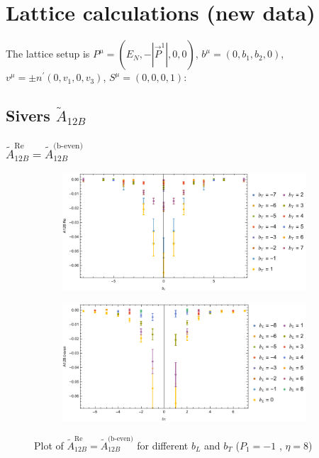 \documentclass[]{article}
\numberwithin{equation}{section}
\newcommand{\tAmp}{\widetilde{A}}
\newcommand{\tAmp}{\ensuremath{\widetilde{A}^{(+)}}}
\begin{document}
\section{Lattice calculations (new data)}
The lattice setup is $P^{\mu}=(E_N, -|\vec{P}^1|,0,0)$, $b^{\mu}=(0,b_{1},b_{2},0)$, $v^{\mu}=\pm n^{\prime}(0,v_{1},0,v_{3})$, $S^{\mu}=(0,0,0,1)$:
\subsection{Sivers $\tAmp_{12B}$}
\subsubsection{$\tAmp^{\text{Re}}_{12B}=\tAmp^{\text{(b-even)}}_{12B}$}
\begin{figure}[h!]
     \centering
     \begin{subfigure}[b]{0.45\textwidth}
         \centering
         \includegraphics[width=\textwidth]{Amp_plots/bL_A12B_b_even_P1_-1_eta_8.pdf}
     \end{subfigure}
     \begin{subfigure}[b]{0.45\textwidth}
         \centering
         \includegraphics[width=\textwidth]{Amp_plots/bT_A12B_b_even_P1_-1_eta_8.pdf}
     \end{subfigure}
        \caption{Plot of  $\tAmp^{\text{Re}}_{12B}=\tAmp^{\text{(b-even)}}_{12B}$ for different $b_{L}$ and $b_{T}$  ($P_{1} = -1$ , $\eta=8$)}
\end{figure}
\end{document}
